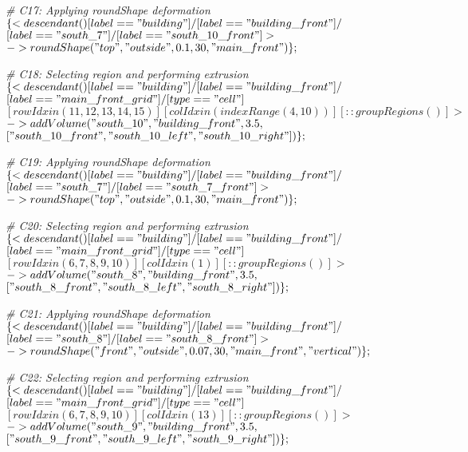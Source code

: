\noindent \textit{\# C17: Applying roundShape deformation}\\
$\{< descendant() [label=="building"] / [label=="building\_front"] / $\\
$[label=="south\_7"] / [label=="south\_10\_front"] > $\\
$-> roundShape("top", "outside", 0.1, 30, "main\_front")\};$

\noindent \textit{\# C18: Selecting region and performing extrusion}\\
$\{< descendant() [label=="building"] / [label=="building\_front"] / $\\
$[label=="main\_front\_grid"] / [type=="cell"] $\\
$[rowIdx in (11, 12, 13, 14, 15)] [colIdx in (indexRange(4, 10))] [::groupRegions()] > $\\
$-> addVolume("south\_10", "building\_front", 3.5, $\\
$["south\_10\_front", "south\_10\_left", "south\_10\_right"])\};$

\noindent \textit{\# C19: Applying roundShape deformation}\\
$\{< descendant() [label=="building"] / [label=="building\_front"] / $\\
$[label=="south\_7"] / [label=="south\_7\_front"] > $\\
$-> roundShape("top", "outside", 0.1, 30, "main\_front")\};$

\noindent \textit{\# C20: Selecting region and performing extrusion}\\
$\{< descendant() [label=="building"] / [label=="building\_front"] / $\\
$[label=="main\_front\_grid"] / [type=="cell"] $\\
$[rowIdx in (6, 7, 8, 9, 10)] [colIdx in (1)] [::groupRegions()] > $\\
$-> addVolume("south\_8", "building\_front", 3.5, $\\
$["south\_8\_front", "south\_8\_left", "south\_8\_right"])\};$

\noindent \textit{\# C21: Applying roundShape deformation}\\
$\{< descendant() [label=="building"] / [label=="building\_front"] / $\\
$[label=="south\_8"] / [label=="south\_8\_front"] > $\\
$-> roundShape("front", "outside", 0.07, 30, "main\_front", "vertical")\};$

\noindent \textit{\# C22: Selecting region and performing extrusion}\\
$\{< descendant() [label=="building"] / [label=="building\_front"] / $\\
$[label=="main\_front\_grid"] / [type=="cell"] $\\
$[rowIdx in (6, 7, 8, 9, 10)] [colIdx in (13)] [::groupRegions()] > $\\
$-> addVolume("south\_9", "building\_front", 3.5, $\\
$["south\_9\_front", "south\_9\_left", "south\_9\_right"])\};$

